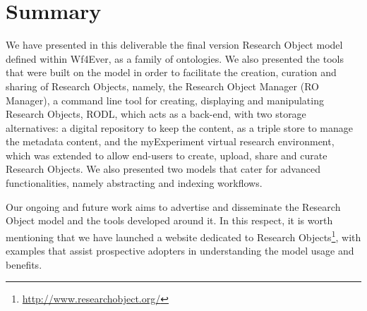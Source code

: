 \section{Summary}
\label{sec:conclusions}

We have presented in this deliverable the final version Research Object model defined within Wf4Ever, as a family of ontologies. We also presented the tools that were built on the model in order to facilitate the creation, curation and sharing of Research Objects, namely, the Research Object Manager (RO Manager), a command line tool for creating, displaying and manipulating Research Objects, RODL, which acts as a back-end, with two storage alternatives: a digital repository to keep the content, as a triple store to manage the metadata content, and the myExperiment virtual research environment, which was extended to allow end-users to create, upload, share and curate Research Objects. We also presented two models that cater for advanced functionalities, namely abstracting and indexing workflows.

Our ongoing and future work aims to advertise and disseminate the Research Object model and the tools developed around it. In this respect, it is worth mentioning that we have launched a website dedicated to Research Objects\footnote{\url{http://www.researchobject.org/}}, with examples that assist prospective adopters in understanding the model usage and benefits.